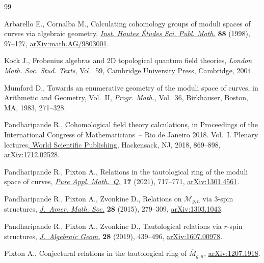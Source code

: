 \documentclass[pdftex]{sigma}
\numberwithin{equation}{section}
\begin{document}
\begin{thebibliography}{99}
\footnotesize\itemsep=0pt

Arbarello E., Cornalba M., Calculating cohomology groups of moduli spaces of
 curves via algebraic geometry, \href{https://doi.org/10.1007/BF02701767}{\textit{Inst. Hautes \'Etudes Sci. Publ.
 Math.}} \textbf{88} (1998), 97--127, \href{https://arxiv.org/abs/math.AG/9803001}{arXiv:math.AG/9803001}.

Kock J., Frobenius algebras and 2{D} topological quantum field theories,
 \textit{London Math. Soc. Stud. Texts}, Vol.~59, \href{https://doi.org/10.1017/CBO9780511615443}{Cambridge University Press},
 Cambridge, 2004.

Mumford D., Towards an enumerative geometry of the moduli space of curves, in
 Arithmetic and {G}eometry, {V}ol.~{II}, \textit{Progr. Math.}, Vol.~36,
 \href{https://doi.org/10.1007/978-1-4757-9286-7_12}{Birkh\"auser}, Boston, MA, 1983, 271--328.

Pandharipande R., Cohomological field theory calculations, in Proceedings of
 the {I}nternational {C}ongress of {M}athematicians~-- {R}io de {J}aneiro
 2018. {V}ol.~{I}. {P}lenary lectures,\href{https://doi.org/10.1142/9789813272880_0031}{ World Scientific Publishing},
 Hackensack, NJ, 2018, 869--898, \href{https://arxiv.org/abs/1712.02528}{arXiv:1712.02528}.

Pandharipande R., Pixton A., Relations in the tautological ring of the moduli
 space of curves, \href{https://doi.org/10.4310/PAMQ.2021.v17.n2.a7}{\textit{Pure Appl. Math.~Q.}} \textbf{17} (2021), 717--771,
 \href{https://arxiv.org/abs/1301.4561}{arXiv:1301.4561}.

Pandharipande R., Pixton A., Zvonkine D., Relations on {$\overline{\mathcal
 M}_{g,n}$} via {$3$}-spin structures, \href{https://doi.org/10.1090/S0894-0347-2014-00808-0}{\textit{J.~Amer. Math. Soc.}}
 \textbf{28} (2015), 279--309, \href{https://arxiv.org/abs/1303.1043}{arXiv:1303.1043}.

Pandharipande R., Pixton A., Zvonkine D., Tautological relations via {$r$}-spin
 structures, \href{https://doi.org/10.1090/jag/736}{\textit{J.~Algebraic Geom.}} \textbf{28} (2019), 439--496,
 \href{https://arxiv.org/abs/1607.00978}{arXiv:1607.00978}.

Pixton A., Conjectural relations in the tautological ring of
 $\overline{M}_{g,n}$, \href{https://arxiv.org/abs/1207.1918}{arXiv:1207.1918}.


\end{thebibliography}
\end{document}

